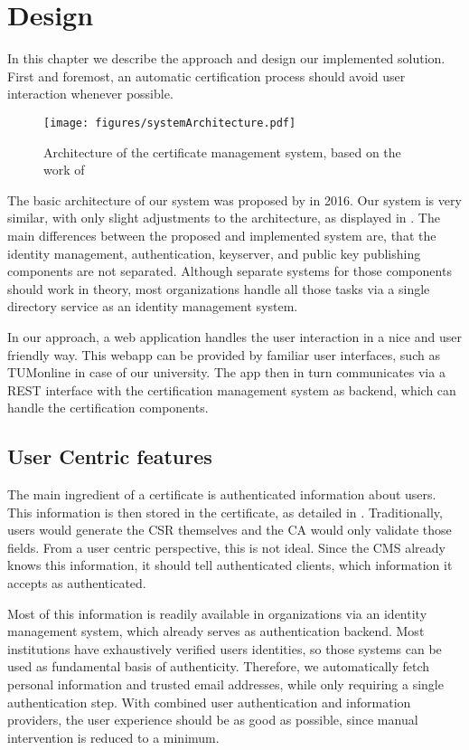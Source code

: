 \chapter{Design}\label{ch:design}

In this chapter we describe the approach and design our implemented solution.
First and foremost, an automatic certification process should avoid user interaction whenever possible.

\begin{figure}
    \centering
    \texttt{[image: figures/systemArchitecture.pdf]}
    \caption{Architecture of the certificate management system, based on the work of \citet{jagdish2016certservice}}
    \label{fig:systemArchitecture}
\end{figure}

The basic architecture of our system was proposed by \citet{jagdish2016certservice} in 2016.
Our system is very similar, with only slight adjustments to the architecture, as displayed in
.
The main differences between the proposed and implemented system are, that the identity management, authentication,
keyserver, and public key publishing components are not separated.
Although separate systems for those components should work in theory, most organizations handle all those tasks via a
single directory service as an identity management system.

In our approach, a web application handles the user interaction in a nice and user friendly way.
This webapp can be provided by familiar user interfaces, such as TUMonline in case of our university.
The app then in turn communicates via a REST interface with the certification management system as backend, which can
handle the certification components.

\section{User Centric features}\label{sec:userDetails}
The main ingredient of a certificate is authenticated information about users.
This information is then stored in the certificate, as detailed in .
Traditionally, users would generate the CSR themselves and the CA would only validate those fields.
From a user centric perspective, this is not ideal.
Since the CMS already knows this information, it should tell authenticated clients, which information it accepts as
authenticated.

Most of this information is readily available in organizations via an identity management system, which already serves
as authentication backend.
Most institutions have exhaustively verified users identities, so those systems can be used as fundamental basis of
authenticity.
Therefore, we automatically fetch personal information and trusted email addresses, while only requiring a single
authentication step.
With combined user authentication and information providers, the user experience should be as good as possible, since
manual intervention is reduced to a minimum.

